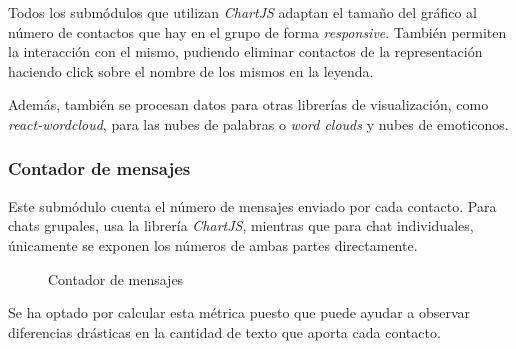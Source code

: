 Todos los submódulos que utilizan \textit{ChartJS} adaptan el tamaño del gráfico al número de contactos que hay en el grupo de forma \textit{responsive}. También permiten la interacción con el mismo, pudiendo eliminar contactos de la representación haciendo click sobre el nombre de los mismos en la leyenda.

Además, también se procesan datos para otras librerías de visualización, como \textit{react-wordcloud}, para las nubes de palabras o \textit{word clouds} y nubes de emoticonos.

\subsubsection{Contador de mensajes}

Este submódulo cuenta el número de mensajes enviado por cada contacto. Para chats grupales, usa la librería \textit{ChartJS}, mientras que para chat individuales, únicamente se exponen los números de ambas partes directamente.

\begin{figure}[H]
	\centering
	\qquad
	\caption{Contador de mensajes}
	\label{fig:chap4:message_count}
\end{figure}

Se ha optado por calcular esta métrica puesto que puede ayudar a observar diferencias drásticas en la cantidad de texto que aporta cada contacto.

